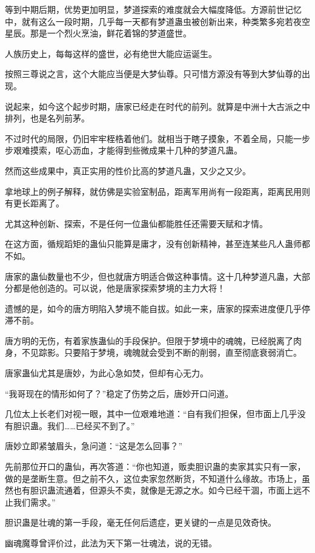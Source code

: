 \begin{this_body}
等到中期后期，优势更加明显，梦道探索的难度就会大幅度降低。方源前世记忆中，就有这么一段时期，几乎每一天都有梦道蛊虫被创新出来，种类繁多宛若夜空星辰。那是一个烈火烹油，鲜花着锦的梦道盛世。

人族历史上，每每这样的盛世，必有绝世大能应运诞生。

按照三尊说之言，这个大能应当便是大梦仙尊。只可惜方源没有等到大梦仙尊的出现。

说起来，如今这个起步时期，唐家已经走在时代的前列。就算是中洲十大古派之中排列，也是名列前茅。

不过时代的局限，仍旧牢牢桎梏着他们。就相当于瞎子摸象，不着全局，只能一步步艰难摸索，呕心沥血，才能得到些微成果十几种的梦道凡蛊。

然而这些成果中，真正实用的性价比高的梦道凡蛊，又少之又少。

拿地球上的例子解释，就仿佛是实验室制品，距离军用尚有一段距离，距离民用则有更长距离了。

尤其这种创新、探索，不是任何一位蛊仙都能胜任还需要天赋和才情。

在这方面，循规蹈矩的蛊仙只能算是庸才，没有创新精神，甚至连某些凡人蛊师都不如。

唐家的蛊仙数量也不少，但也就唐方明适合做这种事情。这十几种梦道凡蛊，大部分都是他创造的。可以说，他是唐家探索梦境的主力大将！

遗憾的是，如今的唐方明陷入梦境不能自拔。如此一来，唐家的探索进度便几乎停滞不前。

唐方明的无伤，有着家族蛊仙的手段保护。但限于梦境中的魂魄，已经脱离了肉身，不见踪影。只要陷于梦境，魂魄就会受到不断的削弱，直至彻底衰弱消亡。

唐家蛊仙尤其是唐妙，为此心急如焚，但却有心无力。

“我哥现在的情形如何了？”稳定了伤势之后，唐妙开口问道。

几位太上长老们对视一眼，其中一位艰难地道：“自有我们担保，但市面上几乎没有胆识蛊。我们……已经买不到了。”

唐妙立即紧皱眉头，急问道：“这是怎么回事？”

先前那位开口的蛊仙，再次答道：“你也知道，贩卖胆识蛊的卖家其实只有一家，做的是垄断生意。但之前不久，这位卖家忽然断货，不知道什么缘故。市场上，虽然也有胆识蛊流通着，但源头不卖，就像是无源之水。如今已经干涸，市面上远不止我们需求。”

胆识蛊是壮魂的第一手段，毫无任何后遗症，更关键的一点是见效奇快。

幽魂魔尊曾评价过，此法为天下第一壮魂法，说的无错。


\end{this_body}
